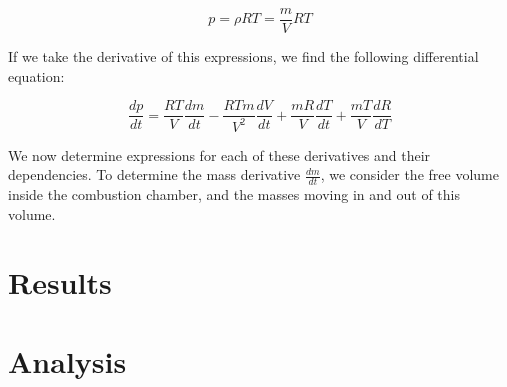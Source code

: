 \documentclass[12pt, letterpaper, twoside]{article}
\begin{document}
\begin{equation}
  p = \rho R T = \frac{m}{V} R T
\end{equation}

If we take the derivative of this expressions, we find the following differential equation:

\begin{equation}
  \frac{dp}{dt} = \frac{R T}{V} \frac{dm}{dt} - \frac{R T m}{V^2} \frac{dV}{dt} + \frac{m R}{V} \frac{dT}{dt} + \frac{m T}{V} \frac{dR}{dT}
\end{equation}

We now determine expressions for each of these derivatives and their dependencies. To determine the mass derivative $\frac{dm}{dt}$, we consider the free volume inside the combustion chamber, and the masses moving in and out of this volume. 



\section{Results}

\section{Analysis}
 
\end{document}
